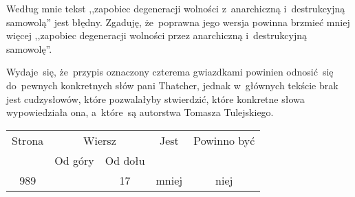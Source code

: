 \documentclass[a4paper,11pt]{article}
\begin{document}
 Według mnie tekst ,,zapobiec degeneracji wolności z~anarchiczną 
i~destrukcyjną samowolą'' jest błędny. Zgaduję, że~poprawna jego wersja powinna 
brzmieć mniej więcej ,,zapobiec degeneracji wolności przez anarchiczną 
i~destrukcyjną samowolę''.

\vspace{\spaceFour}





 Wydaje~się, że~przypis oznaczony czterema gwiazdkami powinien odnosić~się 
do~pewnych konkretnych słów pani Thatcher, jednak w~głównych tekście brak jest 
cudzysłowów, które pozwalałyby stwierdzić, które konkretne słowa wypowiedziała ona,
a~które~są autorstwa Tomasza Tulejskiego. 






\vspace{\spaceFive}


\begin{center}

  \begin{tabular}{|c|c|c|c|c|}
    \hline
    Strona & \multicolumn{2}{c|}{Wiersz} & Jest
                              & Powinno być \\ \cline{2-3}
    & Od góry & Od dołu & & \\
    \hline
    989 & & 17 & mniej & niej \\
    \hline
  \end{tabular}

\end{center}
\end{document}

